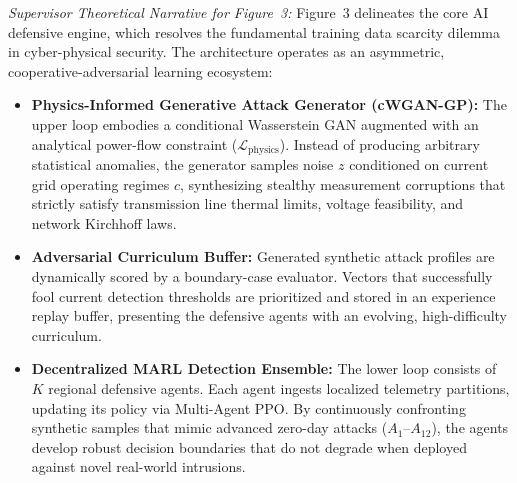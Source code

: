 \documentclass[journal,compsoc]{IEEEtran}
\begin{document}
\textit{Supervisor Theoretical Narrative for Figure~3:}
Figure~3 delineates the core AI defensive engine, which resolves the fundamental training data scarcity dilemma in cyber-physical security. The architecture operates as an asymmetric, cooperative-adversarial learning ecosystem:
\begin{itemize}
    \item \textbf{Physics-Informed Generative Attack Generator (cWGAN-GP):} The upper loop embodies a conditional Wasserstein GAN augmented with an analytical power-flow constraint ($\mathcal{L}_{\text{physics}}$). Instead of producing arbitrary statistical anomalies, the generator samples noise $z$ conditioned on current grid operating regimes $c$, synthesizing stealthy measurement corruptions that strictly satisfy transmission line thermal limits, voltage feasibility, and network Kirchhoff laws.
    \item \textbf{Adversarial Curriculum Buffer:} Generated synthetic attack profiles are dynamically scored by a boundary-case evaluator. Vectors that successfully fool current detection thresholds are prioritized and stored in an experience replay buffer, presenting the defensive agents with an evolving, high-difficulty curriculum.
    \item \textbf{Decentralized MARL Detection Ensemble:} The lower loop consists of $K$ regional defensive agents. Each agent ingests localized telemetry partitions, updating its policy via Multi-Agent PPO. By continuously confronting synthetic samples that mimic advanced zero-day attacks ($A_1$--$A_{12}$), the agents develop robust decision boundaries that do not degrade when deployed against novel real-world intrusions.
\end{itemize}
\end{document}
